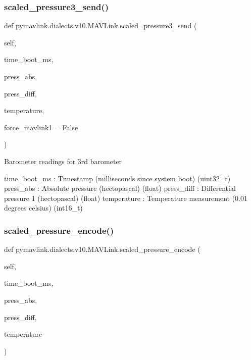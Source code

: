 \begin{DoxyVerb}
\begin{DoxyVerb}
\begin{DoxyVerb}
\begin{DoxyVerb}
\begin{DoxyVerb}
\begin{DoxyVerb}
\begin{DoxyVerb}
\begin{DoxyVerb}
\begin{DoxyVerb}
\begin{DoxyVerb}
\subsubsection{\texorpdfstring{scaled\+\_\+pressure3\+\_\+send()}{scaled\_pressure3\_send()}}
{\footnotesize\ttfamily def pymavlink.\+dialects.\+v10.\+M\+A\+V\+Link.\+scaled\+\_\+pressure3\+\_\+send (\begin{DoxyParamCaption}\item[{}]{self,  }\item[{}]{time\+\_\+boot\+\_\+ms,  }\item[{}]{press\+\_\+abs,  }\item[{}]{press\+\_\+diff,  }\item[{}]{temperature,  }\item[{}]{force\+\_\+mavlink1 = {\ttfamily False} }\end{DoxyParamCaption})}

\begin{DoxyVerb}Barometer readings for 3rd barometer

time_boot_ms              : Timestamp (milliseconds since system boot) (uint32_t)
press_abs                 : Absolute pressure (hectopascal) (float)
press_diff                : Differential pressure 1 (hectopascal) (float)
temperature               : Temperature measurement (0.01 degrees celsius) (int16_t)\end{DoxyVerb}
 \mbox{\label{classpymavlink_1_1dialects_1_1v10_1_1MAVLink_a887b03743667bd9ea3f28473ed399ee5}} 
\subsubsection{\texorpdfstring{scaled\+\_\+pressure\+\_\+encode()}{scaled\_pressure\_encode()}}
{\footnotesize\ttfamily def pymavlink.\+dialects.\+v10.\+M\+A\+V\+Link.\+scaled\+\_\+pressure\+\_\+encode (\begin{DoxyParamCaption}\item[{}]{self,  }\item[{}]{time\+\_\+boot\+\_\+ms,  }\item[{}]{press\+\_\+abs,  }\item[{}]{press\+\_\+diff,  }\item[{}]{temperature }\end{DoxyParamCaption})}


\end{DoxyVerb}
\end{DoxyVerb}
\end{DoxyVerb}
\end{DoxyVerb}
\end{DoxyVerb}
\end{DoxyVerb}
\end{DoxyVerb}
\end{DoxyVerb}
\end{DoxyVerb}
\end{DoxyVerb}
